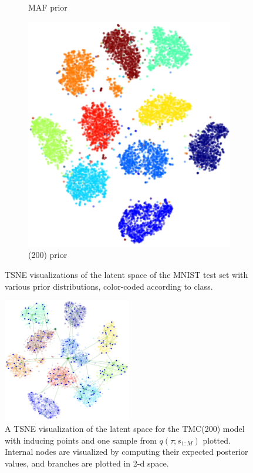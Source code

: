 \begin{figure}[h]
\begin{subfigure}[t]{0.3\textwidth}
    \caption{MAF prior}
\end{subfigure}
\begin{subfigure}[t]{0.3\textwidth}
    \centering
    \includegraphics[width=\textwidth]{img/loracs/mnist/tsne/mnist2-tsne-tmc.png}
    \caption{\acronym(200) prior}
\end{subfigure}
\caption{TSNE visualizations of the latent space of the MNIST test set with various prior distributions, color-coded according to class.}
\label{fig:tsne}
\end{figure}

\begin{figure}[h]
    \centering
    \includegraphics[width=0.5\textwidth]{img/loracs/mnist/tsne/mnist2-tsne-tmc-tree.png}
    \caption{A TSNE visualization of the latent space for the TMC(200) model with inducing points and one sample from $q(\tau; s_{1:M})$ plotted. Internal nodes are visualized by computing their expected posterior values, and branches are plotted in 2-d space.}
    \label{fig:mnist-tsne-tree}
\end{figure}


